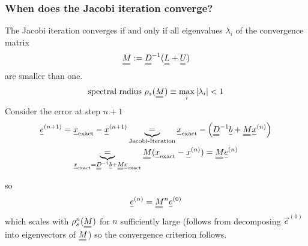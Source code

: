 \subsubsection{When does the Jacobi iteration converge?}
The Jacobi iteration converges if and only if all eigenvalues $\lambda_i$ of the convergence
matrix
\begin{equation}
    \mat{M} := \mat{D}^{-1} (\mat{L} + \mat{U})
\end{equation}
are smaller than one.
\begin{equation}
    \text{spectral radius } \rho_s(\mat{M}) \equiv \max_i{|\lambda_i|} < 1
\end{equation}
Consider the error at step $n+1$
\begin{equation}
    \begin{gathered}
        \vec{e}^{(n+1)} = \vec{x}_{\text{exact}} - \vec{x}^{(n+1)} \underbrace{=}_{\text{Jacobi-Iteration}} \vec{x}_{\text{exact}} - \left( \mat{D}^{-1} \vec{b} + \mat{M} \vec{x}^{(n)} \right) \\
    \underbrace{=}_{\vec{x}_{\text{exact}} = \mat{D}^{-1}\vec{b}+\mat{M}\vec{x}_{\text{exact}}} \mat{M} (\vec{x}_{\text{exact}} - \vec{x}^{(n)}) = \mat{M} \vec{e}^{(n)}
    \end{gathered}
\end{equation}

so
\begin{equation}
    \vec{e}^{(n)} = \mat{M}^n \vec{e}^{(0)}
\end{equation}
which scales with $\rho_s^n(\mat{M})$ for $n$ sufficiently large (follows from decomposing $\vec{e}^{(0)}$ into eigenvectors of $\mat{M}$)
so the convergence criterion follows.


